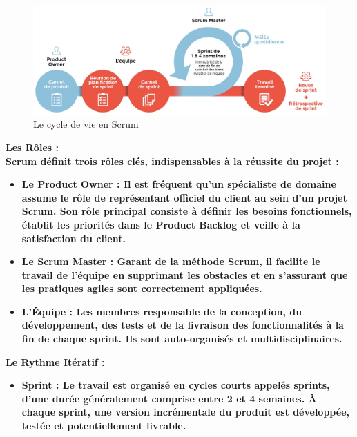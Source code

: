 {\begin{figure}[H]
\centering\includegraphics[scale=0.21]{images/scrum.jpeg}
\caption{Le cycle de vie en Scrum}
\label{scrumSpirale}
\end{figure}


\noindent \bfseries Les Rôles \mdseries : \\
Scrum définit trois rôles clés, indispensables à la réussite du projet :
\begin{itemize}
\item \noindent \bfseries Le Product Owner  \mdseries : Il est fréquent qu'un spécialiste de domaine assume le rôle de représentant officiel du client au sein d'un projet Scrum. Son rôle principal consiste à définir les besoins fonctionnels, établit les priorités dans le Product Backlog et veille à la satisfaction du client.\newline

\item \noindent \bfseries Le Scrum Master \mdseries : Garant de la méthode Scrum, il facilite le travail de l’équipe en supprimant les obstacles et en s’assurant que les pratiques agiles sont correctement appliquées.\\

\item \noindent \bfseries L’Équipe \mdseries : Les membres responsable de la conception, du développement, des tests et de la livraison des fonctionnalités à la fin de chaque sprint. Ils sont auto-organisés et multidisciplinaires. 
\end{itemize}

\noindent \bfseries Le Rythme Itératif \mdseries : 
\begin{itemize}
\item \noindent \bfseries Sprint  \mdseries : Le travail est organisé en cycles courts appelés sprints, d’une durée généralement comprise entre 2 et 4 semaines. À chaque sprint, une version incrémentale du produit est développée, testée et potentiellement livrable.


\end{itemize}}
